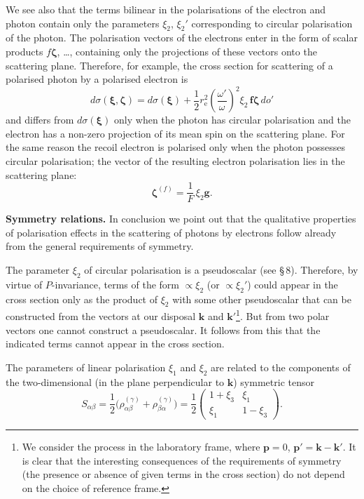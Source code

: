 We see also that the terms bilinear in the polarisations of the electron and photon contain only the parameters $\xi_2$, $\xi_2'$ corresponding to circular polarisation of the photon. The polarisation vectors of the electrons enter in the form of scalar products $f\boldsymbol{\zeta}$, \dots, containing only the projections of these vectors onto the scattering plane. Therefore, for example, the cross section for scattering of a polarised photon by a polarised electron is
\begin{equation}
d\sigma(\boldsymbol{\xi},\boldsymbol{\zeta}) = d\sigma(\boldsymbol{\xi}) + \frac{1}{2}r_\mathrm{e}^2\left(\frac{\omega'}{\omega}\right)^{\!2}\xi_2\,\mathbf{f}\boldsymbol{\zeta}\,do'
\label{eq:87.24}
\end{equation}
and differs from $d\sigma(\boldsymbol{\xi})$ only when the photon has circular polarisation and the electron has a non-zero projection of its mean spin on the scattering plane. For the same reason the recoil electron is polarised only when the photon possesses circular polarisation; the vector of the resulting electron polarisation lies in the scattering plane:
\begin{equation}
\boldsymbol{\zeta}^{(f)} = \frac{1}{F}\,\xi_2\mathbf{g}.
\label{eq:87.25}
\end{equation}

\textbf{Symmetry relations.} In conclusion we point out that the qualitative properties of polarisation effects in the scattering of photons by electrons follow already from the general requirements of symmetry.


The parameter $\xi_2$ of circular polarisation is a pseudoscalar (see \S\,8). Therefore, by virtue of $P$-invariance, terms of the form $\propto \xi_2$ (or $\propto \xi_2'$) could appear in the cross section only as the product of $\xi_2$ with some other pseudoscalar that can be constructed from the vectors at our disposal $\mathbf{k}$ and $\mathbf{k}'$\footnote{We consider the process in the laboratory frame, where $\mathbf{p} = 0$, $\mathbf{p}' = \mathbf{k} - \mathbf{k}'$. It is clear that the interesting consequences of the requirements of symmetry (the presence or absence of given terms in the cross section) do not depend on the choice of reference frame.}. But from two polar vectors one cannot construct a pseudoscalar. It follows from this that the indicated terms cannot appear in the cross section.

The parameters of linear polarisation $\xi_1$ and $\xi_2$ are related to the components of the two-dimensional (in the plane perpendicular to $\mathbf{k}$) symmetric tensor
\begin{equation}
S_{\alpha\beta} = \frac{1}{2}\bigl(\rho^{(\gamma)}_{\alpha\beta} + \rho^{(\gamma)}_{\beta\alpha}\bigr) = \frac{1}{2}\begin{pmatrix} 1 + \xi_3 & \xi_1 \\ \xi_1 & 1 - \xi_3 \end{pmatrix}.
\end{equation}

